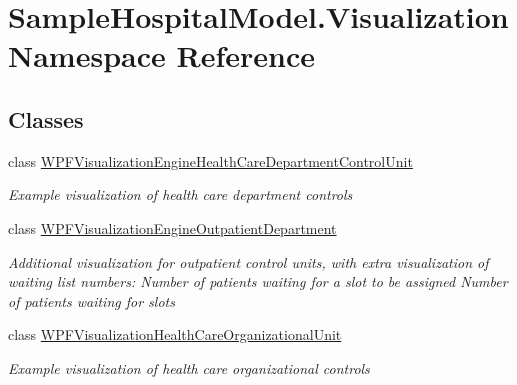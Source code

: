 \hypertarget{namespace_sample_hospital_model_1_1_visualization}{}\section{Sample\+Hospital\+Model.\+Visualization Namespace Reference}
\label{namespace_sample_hospital_model_1_1_visualization}
\subsection*{Classes}
\begin{DoxyCompactItemize}
\item 
class \hyperlink{class_sample_hospital_model_1_1_visualization_1_1_w_p_f_visualization_engine_health_care_department_control_unit}{W\+P\+F\+Visualization\+Engine\+Health\+Care\+Department\+Control\+Unit}
\begin{DoxyCompactList}\small\item\em Example visualization of health care department controls \end{DoxyCompactList}\item 
class \hyperlink{class_sample_hospital_model_1_1_visualization_1_1_w_p_f_visualization_engine_outpatient_department}{W\+P\+F\+Visualization\+Engine\+Outpatient\+Department}
\begin{DoxyCompactList}\small\item\em Additional visualization for outpatient control units, with extra visualization of waiting list numbers\+: Number of patients waiting for a slot to be assigned Number of patients waiting for slots \end{DoxyCompactList}\item 
class \hyperlink{class_sample_hospital_model_1_1_visualization_1_1_w_p_f_visualization_health_care_organizational_unit}{W\+P\+F\+Visualization\+Health\+Care\+Organizational\+Unit}
\begin{DoxyCompactList}\small\item\em Example visualization of health care organizational controls \end{DoxyCompactList}\end{DoxyCompactItemize}

